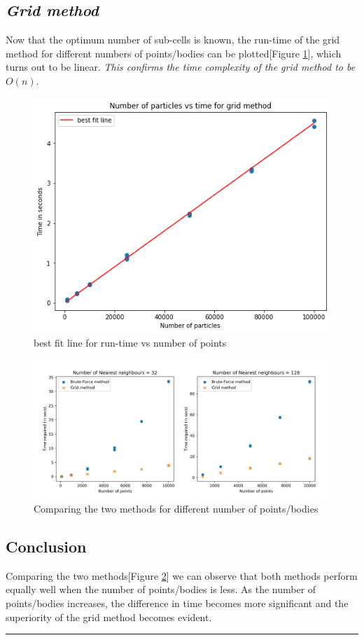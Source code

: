 \documentclass[twocolumn,11pt]{article}
\begin{document}
\subsection{\textit{Grid method}}
Now that the optimum number of sub-cells is known, the run-time of the grid method for different numbers of points/bodies can be plotted[Figure \ref{fig13}], which turns out to be linear. \emph{This confirms the time complexity of the grid method to be $O(n)$}.
\begin{figure}[h]
\centering
	\includegraphics[width=\linewidth]{gridfit}
	\caption{\small{best fit line for run-time vs number of points}}
	\label{fig13}
\end{figure}

\newpage
\onecolumn
\begin{figure}[h]
\centering
	\includegraphics[width=1\linewidth]{fig}
	\caption{\small{Comparing the two methods for different number of points/bodies}}
	\label{fig14}
\end{figure}
\begin{multicols}{2}
\section{Conclusion}
Comparing the two methods[Figure \ref{fig14}] we can observe that both methods perform equally well when the number of points/bodies is less. As the number of points/bodies increases, the difference in time becomes more significant and the superiority of the grid method becomes evident.
\end{multicols}
\rule{\textwidth}{0.5pt}
\end{document}
